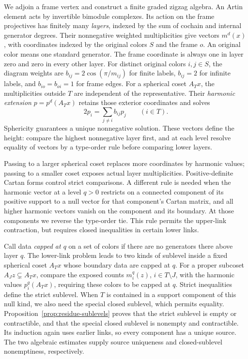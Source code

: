 We adjoin a frame vertex and construct a finite graded zigzag
algebra.  An Artin element acts by invertible bimodule complexes.
Its action on the frame projectives has finitely many
\emph{layers}, indexed by the sum of cochain and internal
generator degrees.  Their nonnegative weighted multiplicities
give vectors \(m^d(x)\), with coordinates indexed by the original
colors \(S\) and the frame \(o\).  An original color means one
standard generator.  The frame coordinate is always one in layer
zero and zero in every other layer.
For distinct original colors $i,j\in S$, the diagram weights are
$b_{ij}=2\cos(\pi/m_{ij})$ for finite labels, $b_{ij}=2$ for
infinite labels, and $b_{io}=b_{oi}=1$ for frame edges.
For a spherical coset \(A_Tx\), the multiplicities outside \(T\) are
independent of the representative.  Their \emph{harmonic extension}
\(p=p^d(A_Tx)\) retains those exterior coordinates and solves
\[
 2p_i=\sum_{j\ne i}b_{ij}p_j\qquad(i\in T).
\]
Sphericity guarantees a unique nonnegative solution.
These vectors define the height: compare the highest nonnegative
layer first, and at each level resolve equality of vectors by a
type-order rule before comparing lower layers.

Passing to a larger spherical coset replaces more coordinates by
harmonic values; passing to a smaller coset exposes actual layer
multiplicities.  Positive-definite Cartan forms control strict
comparisons.  A different rule is needed when the harmonic vector at a
level \(q>0\) restricts on a connected component of its positive support
to a null vector for that component's Cartan matrix, and all higher
harmonic vectors vanish on the component and its boundary.  At those
components we reverse the type-order tie.  This rule permits the
upper-link contraction, but requires closed inequalities in certain
lower links.

Call data \emph{capped at \(q\)} on a set of colors if there are no
generators there above layer \(q\).  The lower-link problem leads to
two kinds of sublevel inside a fixed spherical coset \(A_Tx\) whose
boundary data are capped at \(q\).  For a proper subcoset
\(A_Jz\subsetneq A_Tx\), compare the exposed
counts \(m_i^q(z)\), \(i\in T\setminus J\), with the harmonic values
\(p_i^q(A_Tx)\), requiring these colors to be capped at \(q\).
Strict inequalities define the strict sublevel.  When \(T\) is contained
in a support component of this null kind, we also need the special
closed sublevel,
which permits equality.
Proposition~\ref{prop:residue-sublevels} proves that the strict
sublevel is empty or contractible, and that the special closed
sublevel is nonempty and contractible.  Its induction again uses
earlier links, so every component has a unique source.  The two
algebraic estimates supply source uniqueness and closed-sublevel
nonemptiness, respectively.

